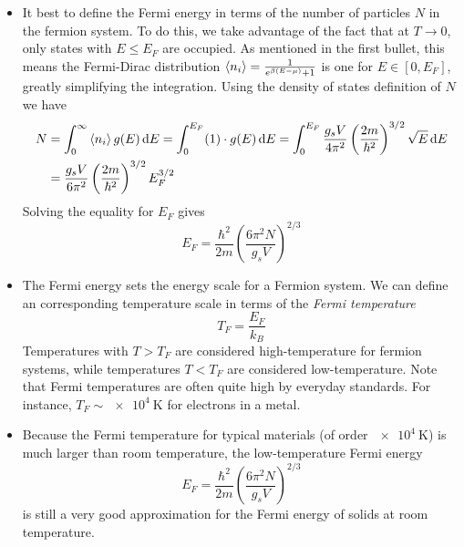\documentclass[11pt, a4paper]{article}
\newcommand{\diff}{\mathop{}\!\mathrm{d}} %
\begin{document}
\begin{itemize}
	\item It best to define the Fermi energy in terms of the number of particles $ N $ in the fermion system. To do this, we take advantage of the fact that at $ T \to 0 $, only states with $ E \leq E_{F} $ are occupied. As mentioned in the first bullet, this means the Fermi-Dirac distribution $ \expval{n_{i}} = \frac{1}{e^{\beta(E - \mu)}+1}$ is one for $ E \in [0, E_{F}] $, greatly simplifying the integration. Using the density of states definition of $ N $ we have
	\begin{align*}
		N &= \int_{0}^{\infty}\expval{n_{i}}g(E) \diff E = \int_{0}^{E_{F}} (1) \cdot g(E) \diff E = \int_{0}^{E_{F}} \frac{g_{s}V}{4\pi^{2}} \left(\frac{2m}{\hbar^{2}}\right)^{3/2} \sqrt{E} \diff E \\
		&= \frac{g_{s}V}{6\pi^{2}} \left(\frac{2m}{\hbar^{2}}\right)^{3/2} E_{F}^{3/2}
	\end{align*}
	Solving the equality for $ E_{F} $ gives
	\begin{equation*}
		E_{F} = \frac{\hbar^{2}}{2m} \left(\frac{6\pi^{2}N}{g_{s}V}\right)^{2/3}
	\end{equation*}
	
	\item The Fermi energy sets the energy scale for a Fermion system. We can define an corresponding temperature scale in terms of the \textit{Fermi temperature}
	\begin{equation*}
		T_{F} = \frac{E_{F}}{k_{B}}
	\end{equation*}
	Temperatures with $ T > T_{F} $ are considered high-temperature for fermion systems, while temperatures $ T < T_{F} $ are considered low-temperature. Note that Fermi temperatures are often quite high by everyday standards. For instance, $ T_{F} \sim \SI{e4}{\kelvin} $ for electrons in a metal.
	
	\item Because the Fermi temperature for typical materials (of order $ \SI{e4}{\kelvin} $) is much larger than room temperature, the low-temperature Fermi energy 
	\begin{equation*}
		E_{F} = \frac{\hbar^{2}}{2m} \left(\frac{6\pi^{2}N}{g_{s}V}\right)^{2/3}
	\end{equation*}
	is still a very good approximation for the Fermi energy of solids at room temperature. 
	

\end{itemize}
\end{document}
